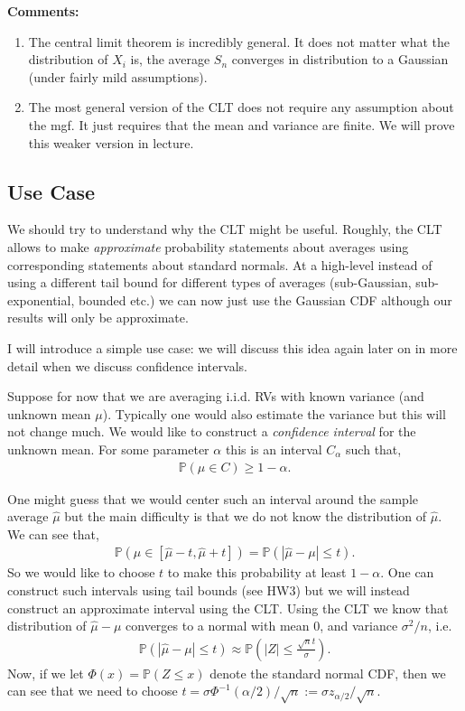 \documentclass[twoside,12pt]{article}
\begin{document}
{\bf Comments:}
\begin{enumerate}
\item The central limit theorem is incredibly general. It does not matter what the distribution of $X_i$ is, the average $S_n$ converges in distribution to a Gaussian (under fairly mild assumptions).
\item The most general version of the CLT does not require any assumption about the mgf. It just requires that the mean and variance are finite. We will prove this weaker version in lecture.
\end{enumerate}


\subsection{Use Case}
We should try to understand why the CLT might be useful. Roughly, the CLT allows to make \emph{approximate} probability statements about averages using corresponding statements about standard normals. At a high-level instead of using a different tail bound for different types of averages (sub-Gaussian, sub-exponential, bounded etc.) we can now just use the Gaussian CDF although our results will only be approximate. 

I will introduce a simple use case: we will discuss this idea again later on in more detail when we discuss confidence intervals.

Suppose for now that we are averaging i.i.d. RVs with known variance (and unknown mean $\mu$). Typically one would also estimate the variance but this will not change much. We would like to construct a \emph{confidence interval} for the unknown mean. For some parameter $\alpha$ this is an interval $C_{\alpha}$ such that,
\begin{align*}
\mathbb{P}(\mu \in C) \geq 1 - \alpha.
\end{align*}

One might guess that we would center such an interval around the sample average $\widehat{\mu}$ but the main difficulty is that we do not know the distribution of $\widehat{\mu}$. We can see that,
\begin{align*}
\mathbb{P}(\mu \in [\widehat{\mu} - t, \widehat{\mu} + t]) =
\mathbb{P}(|\widehat{\mu} - \mu| \leq t).
\end{align*}
So we would like to choose $t$ to make this probability at least $1 - \alpha$.
One can construct such intervals using tail bounds (see HW3) but we will instead construct an approximate interval using the CLT. Using the CLT we know that distribution of $\widehat{\mu} - \mu$ converges to a normal with mean 0, and variance $\sigma^2/n$, i.e.
\begin{align*}
\mathbb{P}(|\widehat{\mu} - \mu| \leq t) \approx \mathbb{P}\left(|Z| \leq \frac{\sqrt{n} t}{\sigma}\right).
\end{align*}
Now, if we let $\Phi(x) = \mathbb{P}(Z \leq x)$ denote the standard normal CDF, then we can see that we need to choose $t = \sigma  \Phi^{-1}(\alpha/2) /\sqrt{n}  := \sigma z_{\alpha/2} / \sqrt{n}.$
\end{document}
